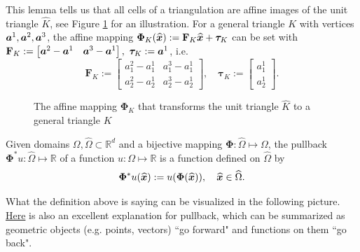 	This lemma tells us that all cells of a triangulation are affine images
	of the unit triangle $\widehat{K}$, see Figure 
	\ref{tikz:2D_affine_transformation_of_triangles} for an illustration.	
	For a general triangle $K$ with vertices 
	$\bm{a}^1,\bm{a}^2,\bm{a}^3$, the affine mapping
	$\bm{\Phi}_K(\widehat{\bm{x}}):=\mathbf{F}_K\widehat{\bm{x}}+\bm{\tau}_K$
	can be set with 
	$\mathbf{F}_K:=\begin{bmatrix}\ba^2-\ba^1 & \ba^3-\ba^1\end{bmatrix},\ 
	\bm{\tau}_K:=\ba^1$, i.e.
	\begin{equation}\label{eq:affine transformation of triangles formula}
		\mathbf{F}_K:=
		\begin{bmatrix}
			a_1^2-a_1^1 & a_1^3-a_1^1\\
			a_2^2-a_2^1 & a_2^3-a_2^1
		\end{bmatrix}, \quad \bm{\tau}_K:=
		\begin{bmatrix}
			a_1^1\\
			a_2^1
		\end{bmatrix}.
	\end{equation}

	\begin{figure}[!htbp]
		\centering
		
		\caption{The affine mapping $\bm{\Phi}_K$ that transforms
			 the unit triangle $\widehat{K}$ to a general triangle $K$}
		\label{tikz:2D_affine_transformation_of_triangles}
	\end{figure}

	\begin{mdframed}[linecolor=blue,linewidth=.5pt,roundcorner=10pt,%
		innertopmargin=0pt]
	\begin{definition}[Pullback]
		Given domains $\Omega,\widehat{\Omega}\subset\mathbb{R}^d$ and a 
		bijective mapping $\bm{\Phi}:\widehat{\Omega}\mapsto\Omega$, the 
		pullback $\bm{\Phi}^*u:\widehat{\Omega}\mapsto\mathbb{R}$ of a 
		function $u:\Omega\mapsto\mathbb{R}$ is a function defined on 
		$\widehat{\Omega}$ by	
		\[\bm{\Phi}^*u(\widehat{\bm{x}}):=u(\bm{\Phi}(\widehat{\bm{x}})),
			\quad \widehat{\bm{x}}\in\widehat{\Omega}.\]
	\end{definition}
	\end{mdframed}

	What the definition above is saying can be visualized in the following 
	picture. \href{https://math.stackexchange.com/a/1189772}{Here} is also an 
	excellent explanation for pullback, which can be summarized as geometric 
	objects (e.g. points, vectors) ``go forward" and functions on them ``go 
	back".
	\begin{figure}[!htbp]
		\centering
		
	\end{figure}

